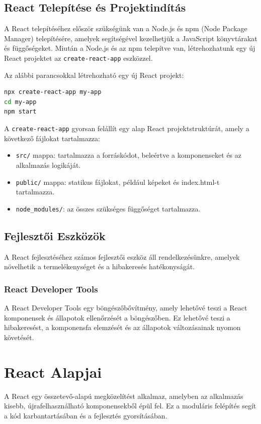 \documentclass[colorlinks]{thesis-kando}
\theoremstyle{definition}
\theoremstyle{remark}
\begin{document}
\subsection{React Telepítése és Projektindítás}
A React telepítéséhez először szükségünk van a Node.js és npm (Node Package Manager) telepítésére, amelyek segítségével kezelhetjük a JavaScript könyvtárakat és függőségeket. Miután a Node.js és az npm telepítve van, létrehozhatunk egy új React projektet az \texttt{create-react-app} eszközzel.

Az alábbi parancsokkal létrehozható egy új React projekt:
\begin{lstlisting}[language=bash]
npx create-react-app my-app
cd my-app
npm start
\end{lstlisting}

\pagebreak

A \texttt{create-react-app} gyorsan felállít egy alap React projektstruktúrát, amely a következő fájlokat tartalmazza:
\begin{itemize}
    \item \texttt{src/} mappa: tartalmazza a forráskódot, beleértve a komponenseket és az alkalmazás logikáját.
    \item \texttt{public/} mappa: statikus fájlokat, például képeket és index.html-t tartalmazza.
    \item \texttt{node\_modules/}: az összes szükséges függőséget tartalmazza.
\end{itemize}

\subsection{Fejlesztői Eszközök}
A React fejlesztéséhez számos fejlesztői eszköz áll rendelkezésünkre, amelyek növelhetik a termelékenységet és a hibakeresés hatékonyságát.


\subsubsection{React Developer Tools}
A React Developer Tools egy böngészőbővítmény, amely lehetővé teszi a React komponensek és állapotok ellenőrzését a böngészőben. Ez lehetővé teszi a hibakeresést, a komponensfa elemzését és az állapotok változásainak nyomon követését.

\section{React Alapjai}
A React egy összetevő-alapú megközelítést alkalmaz, amelyben az alkalmazás kisebb, újrafelhasználható komponensekből épül fel. Ez a moduláris felépítés segít a kód karbantartásában és a fejlesztés gyorsításában.
\end{document}
